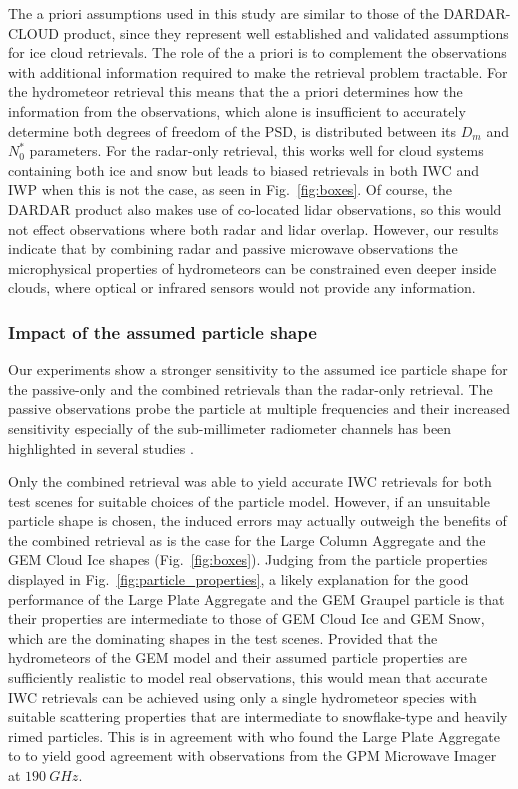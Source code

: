 \documentclass[journal abbreviation, manuscript]{copernicus}
\begin{document}
The a priori assumptions used in this study are similar to those of the DARDAR-CLOUD
product, since they represent well established and validated assumptions for ice
cloud retrievals. The role of the a priori is to complement the observations
with additional information required to make the retrieval problem tractable.
For the hydrometeor retrieval this means that the a priori determines how the
information from the observations, which alone is insufficient to accurately
determine both degrees of freedom of the PSD, is distributed between its $D_m$
and $N_0^*$ parameters. For the radar-only retrieval, this works well for cloud
systems containing both ice and snow but leads to biased retrievals in both IWC
and IWP when this is not the case, as seen in Fig.~\ref{fig:boxes}. Of course,
the DARDAR product also makes use of co-located lidar observations, so this 
would not effect observations where both radar and lidar overlap. However,
our results indicate that by combining radar and passive microwave observations
the microphysical properties of hydrometeors can be constrained even deeper
inside clouds, where optical or infrared sensors would not provide any
information.

\subsubsection{Impact of the assumed particle shape}

Our experiments show a stronger sensitivity to the assumed ice particle shape
for the passive-only and the combined retrievals than the radar-only retrieval.
The passive observations probe the particle at multiple frequencies and their
increased sensitivity especially of the sub-millimeter radiometer channels has
been highlighted in several studies \citep{ekelund20, fox19}.

Only the combined retrieval was able to yield accurate IWC retrievals for both
test scenes for suitable choices of the particle model. However, if an
unsuitable particle shape is chosen, the induced errors may actually outweigh
the benefits of the combined retrieval as is the case for the Large Column
Aggregate and the GEM Cloud Ice shapes (Fig.~\ref{fig:boxes}). Judging from the
particle properties displayed in Fig.~\ref{fig:particle_properties}, a likely
explanation for the good performance of the Large Plate Aggregate and the GEM
Graupel particle is that their properties are intermediate to those of GEM Cloud
Ice and GEM Snow, which are the dominating shapes in the test scenes. Provided
that the hydrometeors of the GEM model and their assumed particle properties are
sufficiently realistic to model real observations, this would mean that accurate
IWC retrievals can be achieved using only a single hydrometeor species with
suitable scattering properties that are intermediate to snowflake-type and
heavily rimed particles. This is in agreement with \citet{ekelund20} who found
the Large Plate Aggregate to to yield good agreement with observations from the
GPM Microwave Imager at $190\ \unit{GHz}$.
\end{document}

